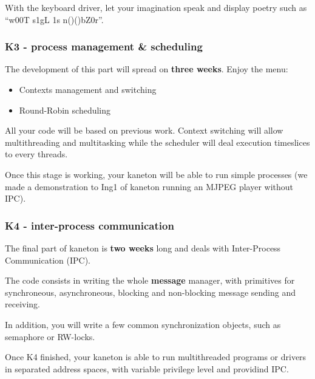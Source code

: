 {\begin{frame}
  With the keyboard driver, let your imagination speak and display
  poetry such as ``w00T s1gL 1s n()()bZ0r''.

\end{frame}


\begin{frame}
  \frametitle{K3 - process management \& scheduling}

  The development of this part will spread on \textbf{three
  weeks}. Enjoy the menu:

  \begin{itemize}
  \item
    Contexts management and switching
  \item
    Round-Robin scheduling
  \end{itemize}

  \-

  All your code will be based on previous work. Context switching will
  allow multithreading and multitasking while the scheduler will deal
  execution timeslices to every threads.

  \-

  Once this stage is working, your kaneton will be able to run simple
  processes (we made a demonstration to Ing1 of kaneton running an
  MJPEG player without IPC).

\end{frame}


\begin{frame}
  \frametitle{K4 - inter-process communication}

  The final part of kaneton is \textbf{two weeks} long and deals with
  Inter-Process Communication (IPC).

  \-

  The code consists in writing the whole \textbf{message} manager,
  with primitives for synchroneous, asynchroneous, blocking and
  non-blocking message sending and receiving.

  \-

  In addition, you will write a few common synchronization objects,
  such as semaphore or RW-locks.

  \-

  Once K4 finished, your kaneton is able to run multithreaded programs
  or drivers in separated address spaces, with variable privilege
  level and providind IPC.

\end{frame}

}
